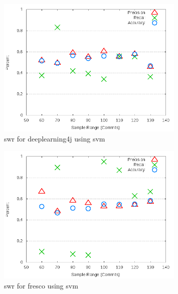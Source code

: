 \begin{figure}[!t]
\centering
\includegraphics[width=0.8\textwidth]{images/svm/test_1/deeplearning4j_sample_range.png}
\caption{\gls{swr} for deeplearning4j using \gls{svm}}
\label{fig:test_1_deeplearning4j_svm}
\end{figure}

\begin{figure}[!t]
\centering
\includegraphics[width=0.8\textwidth]{images/svm/test_1/fresco_sample_range.png}
\caption{\gls{swr} for fresco using \gls{svm}}
\label{fig:test_1_fresco_svm}
\end{figure}

